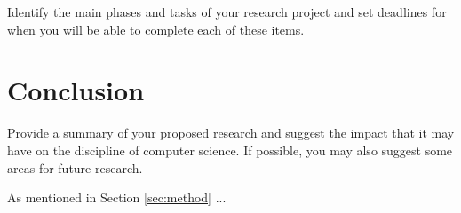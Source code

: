 \documentclass[11pt]{article}
\begin{document}
Identify the main phases and tasks of your research project and set
deadlines for when you will be able to complete each of these items.

\vspace*{-.1in}
\section{Conclusion}
\label{sec:conclusion}
\vspace*{-.1in}

Provide a summary of your proposed research and suggest the impact
that it may have on the discipline of computer science.  If possible,
you may also suggest some areas for future research.

As mentioned in Section \ref{sec:method} ...



\end{document}
